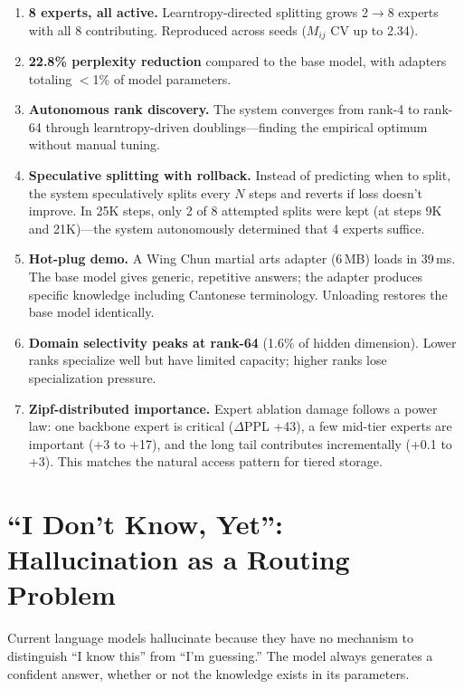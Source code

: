 \documentclass[11pt]{article}
\begin{document}
\begin{enumerate}[nosep]
\item \textbf{8 experts, all active.} Learntropy-directed splitting grows
      2$\to$8 experts with all 8 contributing. Reproduced across seeds
      ($M_{ij}$ CV up to 2.34).
\item \textbf{22.8\% perplexity reduction} compared to the base model,
      with adapters totaling $<$1\% of model parameters.
\item \textbf{Autonomous rank discovery.} The system converges from rank-4
      to rank-64 through learntropy-driven doublings---finding the empirical
      optimum without manual tuning.
\item \textbf{Speculative splitting with rollback.} Instead of
      predicting when to split, the system speculatively splits every
      $N$ steps and reverts if loss doesn't improve. In 25K steps, only
      2 of 8 attempted splits were kept (at steps 9K and 21K)---the
      system autonomously determined that 4 experts suffice.
\item \textbf{Hot-plug demo.} A Wing Chun martial arts adapter (6\,MB)
      loads in 39\,ms. The base model gives generic, repetitive answers;
      the adapter produces specific knowledge including Cantonese
      terminology. Unloading restores the base model identically.
\item \textbf{Domain selectivity peaks at rank-64} (1.6\% of hidden
      dimension). Lower ranks specialize well but have limited capacity;
      higher ranks lose specialization pressure.
\item \textbf{Zipf-distributed importance.} Expert ablation damage follows
      a power law: one backbone expert is critical ($\Delta$PPL +43), a few
      mid-tier experts are important (+3 to +17), and the long tail
      contributes incrementally (+0.1 to +3). This matches the natural
      access pattern for tiered storage.
\end{enumerate}

\section{``I Don't Know, Yet'': Hallucination as a Routing Problem}

Current language models hallucinate because they have no mechanism to
distinguish ``I know this'' from ``I'm guessing.'' The model always
generates a confident answer, whether or not the knowledge exists in its
parameters.
\end{document}
